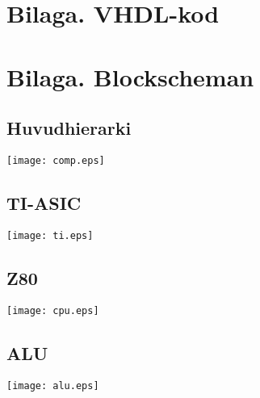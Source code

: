 \documentclass[main.tex]{subfiles}
\begin{document}
\appendix
\section{Bilaga. VHDL-kod}


\newpage
\recalctypearea
\vspace*{-10mm}
\section{Bilaga. Blockscheman}
\subsection{Huvudhierarki}
\label{diag:comp}
\begin{minipage}{\textwidth}
    \texttt{[image: comp.eps]}
\end{minipage}
\vspace*{-10mm}
\subsection{TI-ASIC}
\label{diag:ti}
\begin{minipage}{\textwidth}
    \texttt{[image: ti.eps]}
\end{minipage}
\vspace*{-10mm}
\subsection{Z80}
\label{diag:z80}
\begin{minipage}{\textwidth}
    \vspace{-2mm}
    \hspace{-15mm}
    \texttt{[image: cpu.eps]}
\end{minipage}
\vspace*{-10mm}
\subsection{ALU}
\label{diag:alu}
\begin{minipage}{\textwidth}
    \texttt{[image: alu.eps]}
\end{minipage}
\newpage
\recalctypearea
\end{document}
